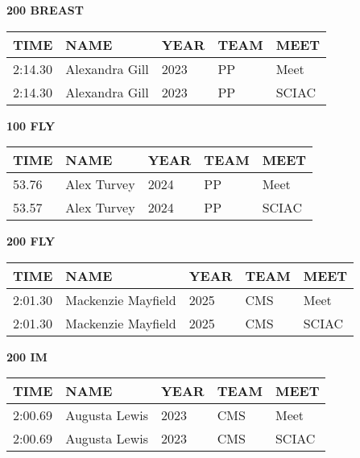 \begin{table}[H]
\centering
\begin{minipage}[t]{0.48\textwidth}
\centering
\textbf{200 BREAST}\\[0.1cm]
\begin{tabular}{@{}p{1.8cm}p{2.8cm}p{1.2cm}p{1.4cm}p{1.4cm}@{}}
\hline
    \textbf{TIME} & \textbf{NAME} & \textbf{YEAR} & \textbf{TEAM} & \textbf{MEET} \\
\hline
    2:14.30 & Alexandra Gill & 2023 & PP & Meet \\
    2:14.30 & Alexandra Gill & 2023 & PP & SCIAC \\
\hline
\end{tabular}
\end{minipage}\hfill
\begin{minipage}[t]{0.48\textwidth}
\centering
\textbf{100 FLY}\\[0.1cm]
\begin{tabular}{@{}p{1.8cm}p{2.8cm}p{1.2cm}p{1.4cm}p{1.4cm}@{}}
\hline
    \textbf{TIME} & \textbf{NAME} & \textbf{YEAR} & \textbf{TEAM} & \textbf{MEET} \\
\hline
    53.76 & Alex Turvey & 2024 & PP & Meet \\
    53.57 & Alex Turvey & 2024 & PP & SCIAC \\
\hline
\end{tabular}
\end{minipage}
\end{table}

\begin{table}[H]
\centering
\begin{minipage}[t]{0.48\textwidth}
\centering
\textbf{200 FLY}\\[0.1cm]
\begin{tabular}{@{}p{1.8cm}p{2.8cm}p{1.2cm}p{1.4cm}p{1.4cm}@{}}
\hline
    \textbf{TIME} & \textbf{NAME} & \textbf{YEAR} & \textbf{TEAM} & \textbf{MEET} \\
\hline
    2:01.30 & Mackenzie Mayfield & 2025 & CMS & Meet \\
    2:01.30 & Mackenzie Mayfield & 2025 & CMS & SCIAC \\
\hline
\end{tabular}
\end{minipage}\hfill
\begin{minipage}[t]{0.48\textwidth}
\centering
\textbf{200 IM}\\[0.1cm]
\begin{tabular}{@{}p{1.8cm}p{2.8cm}p{1.2cm}p{1.4cm}p{1.4cm}@{}}
\hline
    \textbf{TIME} & \textbf{NAME} & \textbf{YEAR} & \textbf{TEAM} & \textbf{MEET} \\
\hline
    2:00.69 & Augusta Lewis & 2023 & CMS & Meet \\
    2:00.69 & Augusta Lewis & 2023 & CMS & SCIAC \\
\hline
\end{tabular}
\end{minipage}
\end{table}

